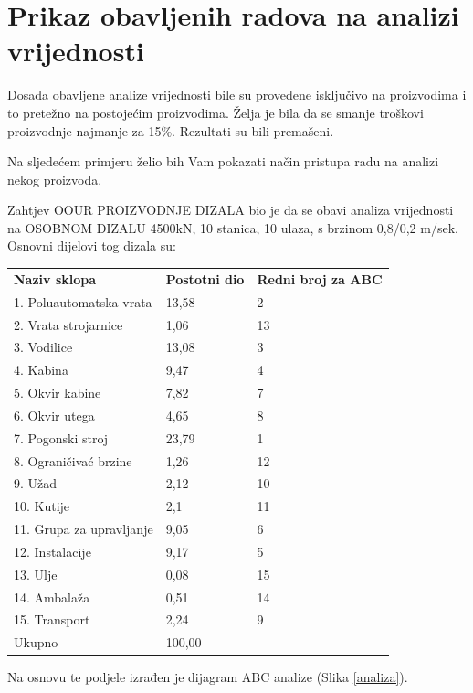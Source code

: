 \documentclass[a4paper,12pt]{article}
\numberwithin{figure}{section}
\begin{document}
\section*{Prikaz obavljenih radova na analizi vrijednosti}
Dosada obavljene analize vrijednosti bile su provedene isključivo na proizvodima i to pretežno na postojećim proizvodima. Želja je bila da se smanje troškovi proizvodnje najmanje za 15\%. Rezultati su bili premašeni.\par
Na sljedećem primjeru želio bih Vam pokazati način pristupa radu na analizi nekog proizvoda.\par
Zahtjev OOUR PROIZVODNJE DIZALA bio je da se obavi analiza vrijednosti na OSOBNOM DIZALU 4500kN, 10 stanica, 10 ulaza, s brzinom 0,8/0,2 m/sek. Osnovni dijelovi tog dizala su:
\FloatBarrier
\begin{table}[h!]
\centering
\begin{tabular}{lll}
\textbf{Naziv sklopa}             & \textbf{Postotni dio}  & \textbf{Redni broj za ABC} \\
1. Poluautomatska vrata  & 13,58         & 2                 \\
2. Vrata strojarnice     & 1,06          & 13                \\
3. Vodilice              & 13,08         & 3                 \\
4. Kabina                & 9,47          & 4                 \\
5. Okvir kabine          & 7,82          & 7                 \\
6. Okvir utega           & 4,65          & 8                 \\
7. Pogonski stroj        & 23,79         & 1                 \\
8. Ograničivać brzine    & 1,26          & 12                \\
9. Užad                  & 2,12          & 10                \\
10. Kutije               & 2,1           & 11                \\
11. Grupa za upravljanje & 9,05          & 6                 \\
12. Instalacije          & 9,17          & 5                 \\
13. Ulje                 & 0,08          & 15                \\
14. Ambalaža             & 0,51          & 14                \\
15. Transport            & 2,24          & 9                 \\ \hline
                         Ukupno & 100,00 &                  
\end{tabular}
\end{table}
Na osnovu te podjele izrađen je dijagram ABC analize (Slika \ref{analiza}).
\end{document}
